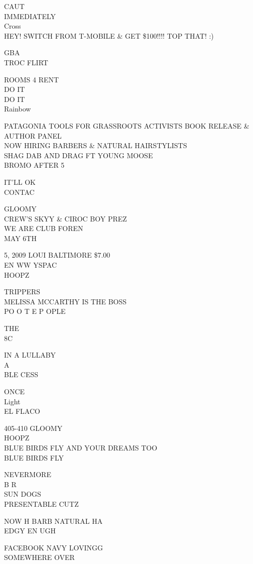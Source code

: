 \documentclass[10pt,letterpaper]{article}
\begin{document}
CAUT\\
IMMEDIATELY\\
Cross\\
HEY!  SWITCH FROM T{-}MOBILE \& GET \$100!!!! TOP THAT! :)

GBA\\
TROC FLIRT

ROOMS 4 RENT\\
DO IT\\
DO IT\\
Rainbow

PATAGONIA TOOLS FOR GRASSROOTS ACTIVISTS BOOK RELEASE \& AUTHOR PANEL\\
NOW HIRING BARBERS \& NATURAL HAIRSTYLISTS\\
SHAG DAB AND DRAG FT YOUNG MOOSE\\
BROMO AFTER 5

IT'LL OK\\
CONTAC

GLOOMY\\
CREW'S SKYY \& CIROC BOY PREZ\\
WE ARE CLUB FOREN\\
MAY 6TH

5, 2009 LOUI BALTIMORE \$7.00\\
EN WW YSPAC\\
HOOPZ

TRIPPERS\\
MELISSA MCCARTHY IS THE BOSS\\
PO O T E P OPLE

THE\\
8C

IN A LULLABY\\
A\\
BLE CESS

ONCE\\
Light\\
EL FLACO

405{-}410 GLOOMY\\
HOOPZ\\
BLUE BIRDS FLY AND YOUR DREAMS TOO\\
BLUE BIRDS FLY

NEVERMORE\\
B R\\
SUN DOGS\\
PRESENTABLE CUTZ

NOW H BARB NATURAL HA\\
EDGY EN UGH

FACEBOOK NAVY LOVINGG\\
SOMEWHERE OVER
\end{document}
